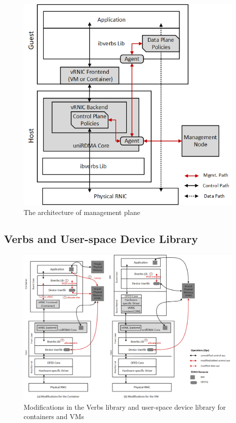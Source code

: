 \begin{figure}[!ht]
	\centering
	\includegraphics[width=1\linewidth]{images/mgmt-center.png}
	\caption{The architecture of \sys management plane}
	\label{fig:mgmt-center}
\end{figure}

\subsection{Verbs and User-space Device Library}


\begin{figure}[!ht]
	\centering
	\includegraphics[width=0.8\linewidth]{images/verbs-driver}
	\caption{Modifications in the Verbs library and user-space device library for containers and VMs}
	\label{fig:verbs-driver}
\end{figure}


